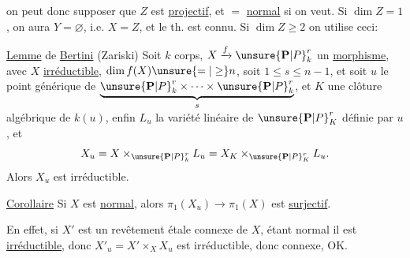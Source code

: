 on peut donc supposer que $Z$ est \uline{projectif},
 et $=$ \uline{normal} si on veut.
Si 
$\dim Z=1$, on aura $Y=\varnothing$, i.e. $X=Z$,
et le th. est connu. Si $\dim Z\geq2$ on utilise ceci:

\uline{Lemme} de \uline{Bertini} (Zariski)
Soit $k$ corps,
$X\xrightarrow{f}\unsure{\mathbf P|P}_k^r$ un \uline{morphisme},
avec $X$ \uline{irréductible},
$\dim f(X)\unsure{=|\geq}n$, soit $1\leq s\leq n-1$, et soit $u$
le point générique de
$\underbrace{\unsure{\mathbf P|P}_k^r\times\cdots\times\unsure{\mathbf P|P}_k^r}_{s}$,
et $K$ une clôture algébrique de $k(u)$,
enfin $L_u$ la variété linéaire de $\unsure{\mathbf P|P}_K^r$ définie par $u$,
et
\[
X_u=X\times_{\unsure{\mathbf P|P}_k^r}L_u=X_K\times_{\unsure{\mathbf P|P}_K^r}L_u.
\]
Alors $X_u$ est irréductible.



\uline{Corollaire} 
Si $X$ est \uline{normal}, alors
$\pi_1(X_u)\to\pi_1(X)$ est \uline{surjectif}.

En effet, si $X'$ est un revêtement 
étale connexe de $X$, étant normal il est \uline{irréductible},
donc $X'_u=X'\times_X X_u$ est irréductible,
donc connexe, OK.

